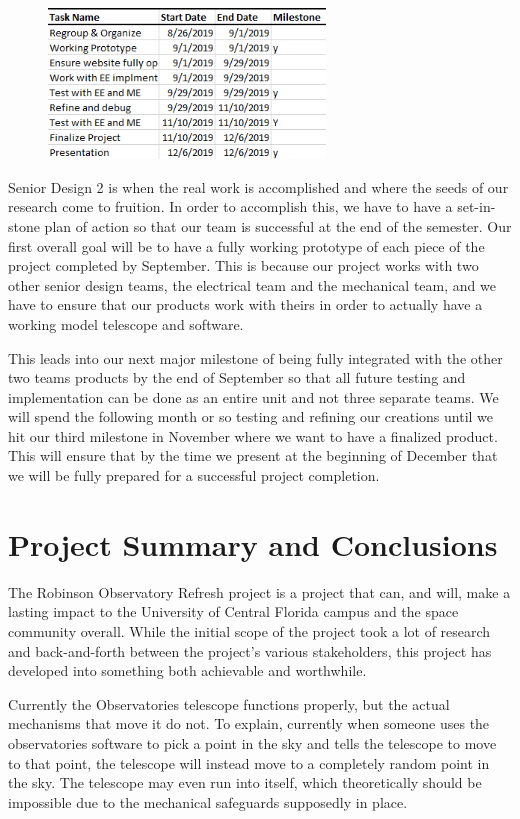 \documentclass[12pt]{report}
\begin{document}
\begin{figure}[h]
	\centering
	\includegraphics[width=0.6\linewidth, height=4.0cm]{SD2Dates}
\end{figure}

Senior Design 2 is when the real work is accomplished and where the seeds of our research come to fruition. In order to accomplish this, we have to have a set-in-stone plan of action so that our team is successful at the end of the semester. Our first overall goal will be to have a fully working prototype of each piece of the project completed by September. This is because our project works with two other senior design teams, the electrical team and the mechanical team, and we have to ensure that our products work with theirs in order to actually have a working model telescope and software.

This leads into our next major milestone of being fully integrated with the other two teams products by the end of September so that all future testing and implementation can be done as an entire unit and not three separate teams. We will spend the following month or so testing and refining our creations until we hit our third milestone in November where we want to have a finalized product. This will ensure that by the time we present at the beginning of December that we will be fully prepared for a successful project completion.

\section*{Project Summary and Conclusions}

The Robinson Observatory Refresh project is a project that can, and will, make a lasting impact to the University of Central Florida campus and the space community overall. While the initial scope of the project took a lot of research and back-and-forth between the project’s various stakeholders, this project has developed into something both achievable and worthwhile.

Currently the Observatories telescope functions properly, but the actual mechanisms that move it do not. To explain, currently when someone uses the observatories software to pick a point in the sky and tells the telescope to move to that point, the telescope will instead move to a completely random point in the sky. The telescope may even run into itself, which theoretically should be impossible due to the mechanical safeguards supposedly in place.
\end{document}
